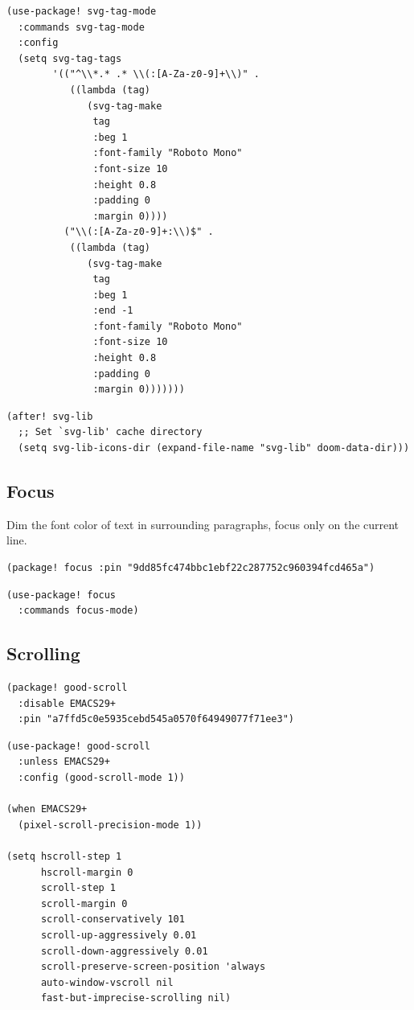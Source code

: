 \documentclass[11pt]{article}
\begin{document}
\begin{verbatim}
(use-package! svg-tag-mode
  :commands svg-tag-mode
  :config
  (setq svg-tag-tags
        '(("^\\*.* .* \\(:[A-Za-z0-9]+\\)" .
           ((lambda (tag)
              (svg-tag-make
               tag
               :beg 1
               :font-family "Roboto Mono"
               :font-size 10
               :height 0.8
               :padding 0
               :margin 0))))
          ("\\(:[A-Za-z0-9]+:\\)$" .
           ((lambda (tag)
              (svg-tag-make
               tag
               :beg 1
               :end -1
               :font-family "Roboto Mono"
               :font-size 10
               :height 0.8
               :padding 0
               :margin 0)))))))
\end{verbatim}

\begin{verbatim}
(after! svg-lib
  ;; Set `svg-lib' cache directory
  (setq svg-lib-icons-dir (expand-file-name "svg-lib" doom-data-dir)))
\end{verbatim}

\subsection{Focus}
\label{sec:org1a58a34}
Dim the font color of text in surrounding paragraphs, focus only on the current line.

\begin{verbatim}
(package! focus :pin "9dd85fc474bbc1ebf22c287752c960394fcd465a")
\end{verbatim}

\begin{verbatim}
(use-package! focus
  :commands focus-mode)
\end{verbatim}

\subsection{Scrolling}
\label{sec:org036b12d}

\begin{verbatim}
(package! good-scroll
  :disable EMACS29+
  :pin "a7ffd5c0e5935cebd545a0570f64949077f71ee3")
\end{verbatim}

\begin{verbatim}
(use-package! good-scroll
  :unless EMACS29+
  :config (good-scroll-mode 1))

(when EMACS29+
  (pixel-scroll-precision-mode 1))

(setq hscroll-step 1
      hscroll-margin 0
      scroll-step 1
      scroll-margin 0
      scroll-conservatively 101
      scroll-up-aggressively 0.01
      scroll-down-aggressively 0.01
      scroll-preserve-screen-position 'always
      auto-window-vscroll nil
      fast-but-imprecise-scrolling nil)
\end{verbatim}
\end{document}

